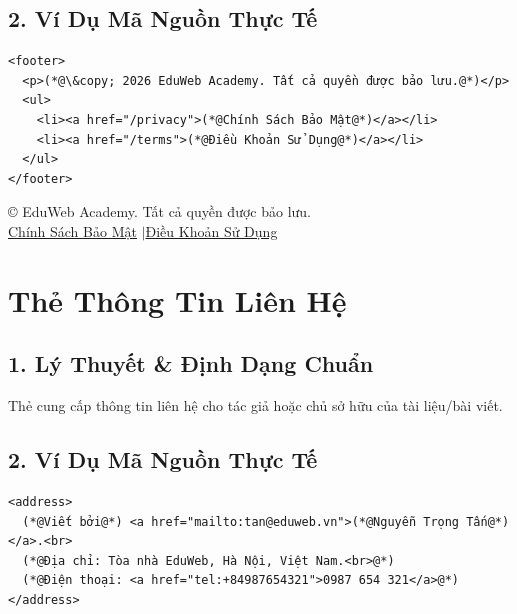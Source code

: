 \subsection{2. Ví Dụ Mã Nguồn Thực Tế}
\begin{codeWindow}
\begin{lstlisting}[language=HTML5]
<footer>
  <p>(*@\&copy; 2026 EduWeb Academy. Tất cả quyền được bảo lưu.@*)</p>
  <ul>
    <li><a href="/privacy">(*@Chính Sách Bảo Mật@*)</a></li>
    <li><a href="/terms">(*@Điều Khoản Sử Dụng@*)</a></li>
  </ul>
</footer>
\end{lstlisting}
\end{codeWindow}

\begin{browserWindow}
\sffamily\small
\begin{tcolorbox}[colback=gray!10, colframe=gray!30, arc=4pt]
\centering
\small \copyright{} EduWeb Academy. Tất cả quyền được bảo lưu.\\[3pt]
\textcolor{primaryBlue}{\underline{Chính Sách Bảo Mật}} \quad$\vert$\quad \textcolor{primaryBlue}{\underline{Điều Khoản Sử Dụng}}
\end{tcolorbox}
\end{browserWindow}

\section{Thẻ Thông Tin Liên Hệ }
\subsection{1. Lý Thuyết \& Định Dạng Chuẩn}
Thẻ  cung cấp thông tin liên hệ cho tác giả hoặc chủ sở hữu của tài liệu/bài viết.

\subsection{2. Ví Dụ Mã Nguồn Thực Tế}
\begin{codeWindow}
\begin{lstlisting}[language=HTML5]
<address>
  (*@Viết bởi@*) <a href="mailto:tan@eduweb.vn">(*@Nguyễn Trọng Tấn@*)</a>.<br>
  (*@Địa chỉ: Tòa nhà EduWeb, Hà Nội, Việt Nam.<br>@*)
  (*@Điện thoại: <a href="tel:+84987654321">0987 654 321</a>@*)
</address>
\end{lstlisting}
\end{codeWindow}

